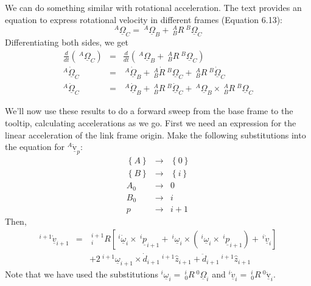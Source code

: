 \documentclass[fleqn]{article}
\begin{document}
We can do something similar with rotational acceleration. The text provides an equation to express rotational velocity in different frames (Equation 6.13):
\begin{displaymath}
 ^{A}\underline{\Omega}_{C} = \ ^{A}\underline{\Omega}_{B} + \ ^{A}_{B}R\ ^{B}\underline{\Omega}_{C}
\end{displaymath}
Differentiating both sides, we get
\begin{eqnarray}
	\frac{d}{dt} \left(\ ^{A}\underline{\Omega}_{C} \right) & = & \frac{d}{dt} \left(\ ^{A}\underline{\Omega}_{B} + \ ^{A}_{B}R\ ^{B}\underline{\Omega}_{C} \right) \nonumber \\
	^{A}\underline{\dot{\Omega}}_{C} & = & \ ^{A}\underline{\dot{\Omega}}_{B} + \ ^{A}_{B}\dot{R}\ ^{B}\underline{\Omega}_{C} + \ ^{A}_{B}R\ ^{B}\underline{\dot{\Omega}}_{C} \nonumber \\
	^{A}\underline{\dot{\Omega}}_{C} & = &\ ^{A}\underline{\dot{\Omega}}_{B} + \ ^{A}_{B}R\ ^{B}\underline{\dot{\Omega}}_{C} + \ ^{A}\underline{\Omega}_{B}\times\ ^{A}_{B}R\ ^{B}\underline{\Omega}_{C} \nonumber
\end{eqnarray}

We'll now use these results to do a forward sweep from the base frame to the tooltip, calculating accelerations as we go. First we need an expression for the linear acceleration of the link frame origin. Make the following substitutions into the equation for $^{A}\underline{\dot{\mathrm{v}}}_{p}$:
\begin{eqnarray}
	\left\{A\right\} & \rightarrow & \left\{ 0 \right\} \nonumber \\
	\left\{B\right\} & \rightarrow & \left\{ i \right\} \nonumber \\
	A_{0} & \rightarrow & 0 \nonumber \\
	B_{0} & \rightarrow & i \nonumber \\
	p & \rightarrow & i+1 \nonumber
\end{eqnarray}
Then,
\begin{eqnarray}
^{i+1}\underline{\dot{v}}_{i+1} & = & \ ^{i+1}_{i}R\left[\ ^{i}\underline{\dot{\omega}}_{i}\times\ ^{i}\underline{p}_{i+1} +\ ^{i}\underline{\omega}_{i}\times\left(\ ^{i}\underline{\omega}_{i}\times\ ^{i}\underline{p}_{i+1}\right)+\ ^{i}\underline{\dot{v}}_{i}\right] \nonumber \\
&& + 2\ ^{i+1}\underline{\omega}_{i+1}\times\dot{d}_{i+1}\ ^{i+1}\hat{z}_{i+1} + \ddot{d}_{i+1}\ ^{i+1}\hat{z}_{i+1}
\end{eqnarray}
Note that we have used the substitutions $^{i}\underline{\omega}_{i} = \ ^{i}_{0}R\ ^{0}\underline{\Omega}_{i}$ and $^{i}\underline{\dot{v}}_{i} = \ ^{i}_{0}R\ ^{0}\underline{\dot{\mathrm{v}}}_{i}$.
\end{document}
